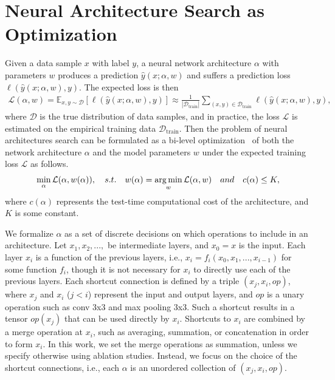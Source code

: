\section{Neural Architecture Search as Optimization}

Given a data sample $x$ with label $y$, a neural network architecture $\alpha$ with parameters $w$ produces 
a prediction $\hat{y}(x ; \alpha, w)$ and suffers a prediction loss $\ell(\hat{y}(x ; \alpha, w), y)$.
The expected loss is then 
\begin{align}
\mathcal{L}(\alpha, w) = \mathbb{E} _{x, y \sim \mathcal{D}} [ \ell(\hat{y}(x ; \alpha, w), y) ] 
\approx \frac{1}{|\mathcal{D}_\textrm{train}|}
   \sum _{(x, y) \in \mathcal{D}_\textrm{train}} \ell(\hat{y}(x ; \alpha, w), y) ,
\end{align}
where $\mathcal{D}$ is the true distribution of data samples, and in practice,
the loss $\mathcal{L}$ is estimated on the empirical training data $\mathcal{D}_\textrm{train}$. 
Then the problem of neural architectures search can be formulated as a bi-level optimization~\citep{bilevel_opt}
of both the network architecture $\alpha$ and the model parameters $w$ under the expected training loss $\mathcal{L}$ 
as follows.
\begin{align}
\min _{\alpha} \mathcal{L} (\alpha, w(\alpha)),
\quad
s.t. \quad w(\alpha) = \operatorname*{arg\,min} _w \mathcal{L} (\alpha, w) 
\quad and \quad c(\alpha) \leq K,
\label{eq:bilevel_nas}
\end{align}
where $c(\alpha)$ represents the test-time computational cost of the architecture, and $K$ is some constant. 

We formalize $\alpha$ as a set of discrete decisions on which operations to include in an architecture.
Let $x_1, x_2,...,$ be intermediate layers, and $x_0 = x$ is the input. Each layer $x_i$ is a function
of the previous layers, i.e., $x_{i} = f_i ( x_0, x_1,..., x_{i-1})$ for some function $f_i$, 
though it is not necessary for $x_i$ to directly use each of the previous layers.
Each shortcut connection is defined by a triple $(x_{j}, x_{i}, op)$, 
where $x_j$ and $x_i$ ($j < i$) represent the input and output layers, and $op$ is a unary operation such 
as conv 3x3 and max pooling 3x3. Such a shortcut results in a tensor $op(x_{j})$ that can be used directly by 
$x_i$. Shortcuts to $x_i$ are combined by a merge operation 
at $x_i$, such as averaging, summation, or concatenation in order to form $x_i$.
In this work, we set the merge operations as summation, unless we specify otherwise using ablation studies. Instead, we focus on the choice of the shortcut connections, i.e., each $\alpha$ is an unordered collection of $(x_j, x_i, op)$.  

